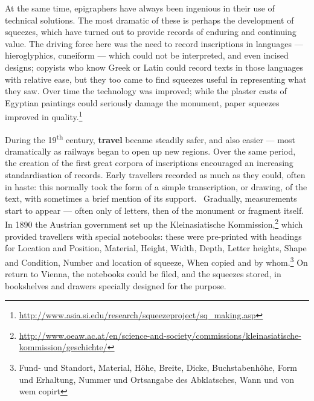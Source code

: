 \documentclass[amsthm,ebook]{saparticle}
\begin{document}
At the same time, epigraphers have always been ingenious in their use of technical solutions. The most dramatic of these
is perhaps the development of squeezes, which have turned out to provide records of enduring and continuing value. The
driving force here was the need to record inscriptions in languages --- hieroglyphics, cuneiform --- which could not be
interpreted, and even incised designs; copyists who know Greek or Latin could record texts in those languages with
relative ease, but they too came to find squeezes useful in representing what they saw. Over time the technology was
improved; while the plaster casts of Egyptian paintings could seriously damage the monument, paper squeezes improved in
quality.\footnote{\url{ http://www.asia.si.edu/research/squeezeproject/sq\_making.asp}} 


During the 19\textsuperscript{th} century, \textbf{travel} became steadily safer, and also easier --- most dramatically as railways began to open up
new regions. Over the same period, the creation of the first great corpora of inscriptions encouraged an increasing
standardisation of records. Early travellers recorded as much as they could, often in haste: this normally took the
form of a simple transcription, or drawing, of the text, with sometimes a brief mention of its support. \ Gradually,
measurements start to appear --- often only of letters, then of the monument or fragment itself. In 1890 the Austrian
government set up the Kleinasiatische Kommission,\footnote{
\url{http://www.oeaw.ac.at/en/science-and-society/commissions/kleinasiatische-kommission/geschichte/}} which provided
travellers with special notebooks: these were pre-printed with headings for Location and Position, Material, Height,
Width, Depth, Letter heights, Shape and Condition, Number and location of squeeze, When copied and by whom.\footnote{
Fund- und Standort, Material, Höhe, Breite, Dicke, Buchstabenhöhe, Form und Erhaltung, Nummer und Ortsangabe des
Abklatsches, Wann und von wem copirt} On return to Vienna, the notebooks could be filed, and the squeezes stored, in
bookshelves and drawers specially designed for the purpose.
\end{document}
